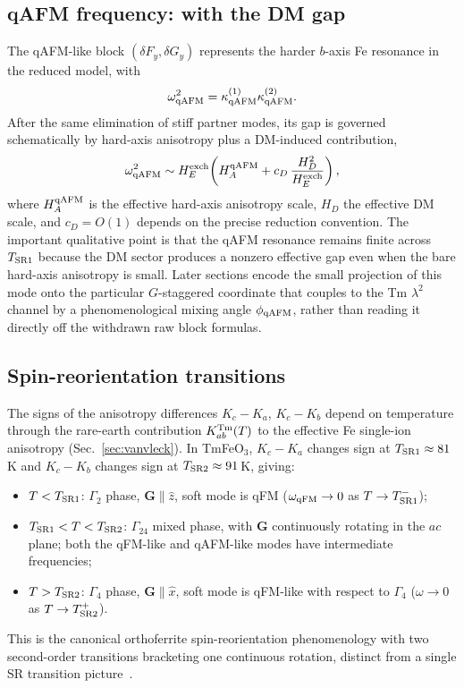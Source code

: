 \documentclass[reprint,amsmath,amssymb,aps,prb,longbibliography]{revtex4-2}
\newcommand{\fix}[1]{#1}
\newcommand{\bfG}{\mathbf{G}}
\begin{document}
\subsection{qAFM frequency: with the DM gap}
\label{sec:qAFMfreq}

The qAFM-like block $(\delta F_y, \delta G_y)$ represents the harder
$b$-axis Fe resonance in the reduced model, with
\begin{equation}
\omega_{\rm qAFM}^2 = \kappa_{\rm qAFM}^{(1)}\kappa_{\rm qAFM}^{(2)}.
\label{eq:omqAFMexact}
\end{equation}
After the same elimination of stiff partner modes, its gap is governed
schematically by hard-axis anisotropy plus a DM-induced contribution,
\begin{equation}
\omega_{\rm qAFM}^2 \sim H_E^{\rm exch}\!\left(H_A^{\rm qAFM} + c_D\,\frac{H_D^2}{H_E^{\rm exch}}\right),
\label{eq:omqAFM}
\end{equation}
where $H_A^{\rm qAFM}$ is the effective hard-axis anisotropy scale,
$H_D$ the effective DM scale, and $c_D=O(1)$ depends on the precise
reduction convention. The important qualitative point is that the qAFM
resonance remains finite across $T_{\rm SR1}$ because the DM sector
produces a nonzero effective gap even when the bare hard-axis
anisotropy is small. Later sections encode the small projection of this
mode onto the particular $G$-staggered coordinate that couples to the
Tm $\lambda^2$ channel by a phenomenological mixing angle
$\phi_{\rm qAFM}$, rather than reading it directly off the withdrawn raw
block formulas.

\subsection{Spin-reorientation transitions}

The signs of the anisotropy differences $K_c - K_a$, $K_c - K_b$ depend
on temperature through the rare-earth contribution
$K^{\rm Tm}_{ab}(T)$ to the effective Fe single-ion anisotropy
(Sec.~\ref{sec:vanvleck}). In TmFeO$_3$, $K_c - K_a$ changes sign at
$T_{\rm SR1}\approx 81$\,K and $K_c - K_b$ changes sign at
$T_{\rm SR2}\approx 91$\,K, giving:
\begin{itemize}[leftmargin=*]
\item $T < T_{\rm SR1}$: $\Gamma_2$ phase, $\bfG\parallel\hat z$,
soft mode is qFM ($\omega_{\rm qFM}\to 0$ as $T\to T_{\rm SR1}^-$);\
\item $T_{\rm SR1} < T < T_{\rm SR2}$: $\Gamma_{24}$ mixed phase, with
$\bfG$ continuously rotating in the $ac$ plane; both the qFM-like and
qAFM-like modes have intermediate frequencies;\
\item $T > T_{\rm SR2}$: $\Gamma_4$ phase, $\bfG\parallel\hat x$, soft
mode is qFM-like with respect to $\Gamma_4$ ($\omega\to 0$ as $T\to T_{\rm SR2}^+$).
\end{itemize}
\fix{This is the canonical orthoferrite spin-reorientation phenomenology
with two second-order transitions bracketing one continuous rotation},
distinct from a single SR transition picture~\cite{ShapiroAxeBirgeneau1974,Yamaguchi1974,Belov1976}.
\end{document}
